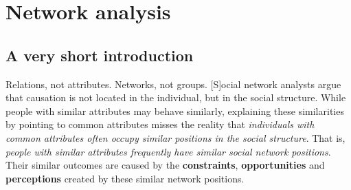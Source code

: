 \documentclass[serif, aspectratio=169]{beamer}
\begin{document}
\section{Network analysis}

\subsection{A very short introduction}

\begin{frame}

\begin{block}{Relations, not attributes. Networks, not groups.}
[S]ocial network analysts argue that causation is not located in the individual, but in the social structure. While people with similar attributes may behave similarly, explaining these similarities by pointing to common attributes misses the reality that \textit{individuals with common attributes often occupy similar positions in the social structure}. That is, \textit{people with similar attributes frequently have similar social network positions}. Their similar outcomes are caused by the \textbf{constraints}, \textbf{opportunities} and \textbf{perceptions} created by these similar network positions. \autocite[13]{marin_social_2011}
\end{block}

\end{frame}
\end{document}
